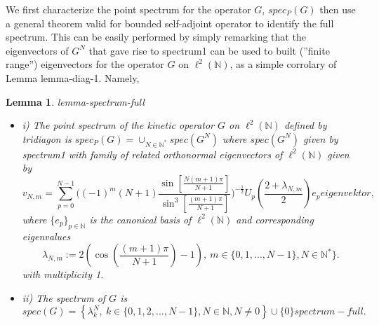 \documentclass[10pt]{book}
\theoremstyle{break}
\newtheorem{lemma}{Lemma}
\begin{document}
We first characterize the point spectrum for the operator $G$, $spec_P(G)$ then use a general theorem valid for bounded self-adjoint operator to identify the full spectrum. This can be easily performed by simply remarking that the eigenvectors of $G^N$ that gave rise to {spectrum1} can be used to built (''finite range'') eigenvectors for the operator $G$ on $\ell^2(\mathbb{N})$, as a simple corrolary of Lemma {lemma-diag-1}. Namely, 
\begin{lemma}{lemma-spectrum-full} 
\begin{itemize}
\setlength{\itemsep}{-1pt}
\item i) The point spectrum of the kinetic operator $G$ on $\ell^2(\mathbb{N})$ defined by {tridiagon} is $spec_P(G)=\cup_{N\in\mathbb{N}^*}spec(G^N)$ where $spec(G^N)$ given by {spectrum1} with family of related orthonormal eigenvectors of $\ell^2(\mathbb{N})$ given by 
\begin{equation}
v_{N,m}=\sum_{p=0}^{N-1}\bigg((-1)^m(N+1){\frac{ \sin[{\frac{N(m+1)\pi }{N+1 }}  ]}{\sin^3[{\frac{(m+1)\pi }{N+1 }} ] }} \bigg)^{-{\frac12}}  U_p\left({\frac{2+\lambda_{N,m}}{2}}\right)e_p{eigenvektor},
\end{equation}
where $\{e_p\}_{p\in\mathbb{N}}$ is the canonical basis of $\ell^2(\mathbb{N})$ and corresponding eigenvalues
\begin{equation}
\lambda_{N,m}:=2\left(\cos\left({\frac{(m+1)\pi}{N+1}}\right)-1\right), \ m\in\{0,1,...,N-1\}, N\in\mathbb{N}^*\}.
\end{equation}
with multiplicity 1.
\item ii) The spectrum of $G$ is 
\begin{equation}
spec(G)=\left\{\lambda^N_k,\ k\in\{0,1,2,...,N-1\}, N\in\mathbb{N}, N\ne0 \right\}\cup\{0\}{spectrum-full}.
\end{equation}
\end{itemize}
\end{lemma}
\end{document}
